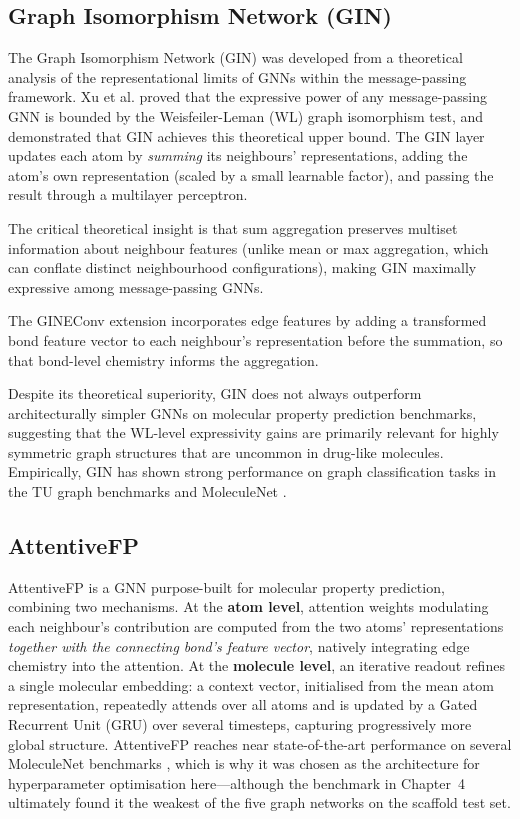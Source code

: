 \subsection{Graph Isomorphism Network (GIN)}

The Graph Isomorphism Network (GIN) \parencite{xu2019gin} was developed from
a theoretical analysis of the representational limits of GNNs within the
message-passing framework. Xu et al. proved that the expressive power of any
message-passing GNN is bounded by the Weisfeiler-Leman (WL) graph isomorphism
test, and demonstrated that GIN achieves this theoretical upper bound. The GIN
layer updates each atom by \textit{summing} its neighbours' representations, adding
the atom's own representation (scaled by a small learnable factor), and passing the
result through a multilayer perceptron.

The critical theoretical insight is that sum aggregation preserves multiset
information about neighbour features (unlike mean or max aggregation, which
can conflate distinct neighbourhood configurations), making GIN maximally
expressive among message-passing GNNs.

The GINEConv \parencite{hu2020strategies} extension incorporates edge features by
adding a transformed bond feature vector to each neighbour's representation before
the summation, so that bond-level chemistry informs the aggregation.

Despite its theoretical superiority, GIN does not always outperform architecturally
simpler GNNs on molecular property prediction benchmarks, suggesting that
the WL-level expressivity gains are primarily relevant for highly symmetric
graph structures that are uncommon in drug-like molecules. Empirically, GIN has
shown strong performance on graph classification tasks in the TU graph benchmarks
and MoleculeNet \parencite{wu2018moleculenet}.

\subsection{AttentiveFP}

AttentiveFP \parencite{xiong2020attentivefp} is a GNN purpose-built for molecular
property prediction, combining two mechanisms. At the \textbf{atom level}, attention
weights modulating each neighbour's contribution are computed from the two atoms'
representations \emph{together with the connecting bond's feature vector}, natively
integrating edge chemistry into the attention. At the \textbf{molecule level}, an
iterative readout refines a single molecular embedding: a context vector, initialised
from the mean atom representation, repeatedly attends over all atoms and is updated by
a Gated Recurrent Unit (GRU) over several timesteps, capturing progressively more
global structure. AttentiveFP reaches near state-of-the-art performance on several
MoleculeNet benchmarks \parencite{xiong2020attentivefp, jiang2021gnn}, which is why it
was chosen as the architecture for hyperparameter optimisation here---although the
benchmark in Chapter~4 ultimately found it the weakest of the five graph networks on
the scaffold test set.


